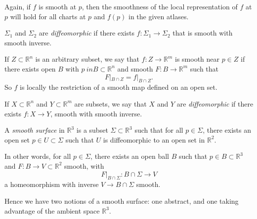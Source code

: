 \documentclass[12pt]{article}
\begin{document}
Again, if $f$ is smooth at $p$, then the smoothness of the local representation of $f$ at $p$ will hold for all charts at $p$ and $f(p)$ in the given atlases.

\begin{definition}
	$\Sigma_1$ and $\Sigma_2$ are \emph{diffeomorphic} if there exists $f : \Sigma_1 \to \Sigma_2$ that is smooth with smooth inverse.
\end{definition}

\begin{definition}
	If $Z \subset \mathbb{R}^{n}$ is an arbitrary subset, we say that $f : Z \to \mathbb{R}^{m}$ is smooth near $p \in Z$ if there exists open $B$ with $p\ in B \subset \mathbb{R}^{n}$ and smooth $F : B \to \mathbb{R}^{m}$ such that
	\[
	F|_{B \cap Z} = f|_{B \cap Z}
	.\]
	So $f$ is locally the restriction of a smooth map defined on an open set.
\end{definition}

\begin{definition}
	If $X \subset \mathbb{R}^{n}$ and $Y \subset \mathbb{R}^{m}$ are subsets, we say that $X$ and $Y$ are \emph{diffeomorphic} if there exists $f : X \to Y$, smooth with smooth inverse.
\end{definition}

\begin{definition}
	A \emph{smooth surface} in $\mathbb{R}^3$ is a subset $\Sigma \subset \mathbb{R}^3$ such that for all $p \in \Sigma$, there exists an open set $p \in U \subset \Sigma$ such that $U$ is diffeomorphic to an open set in $\mathbb{R}^2$.

	In other words, for all $p \in \Sigma$, there exists an open ball $B$ such that $p\in B \subset \mathbb{R}^3$ and $F : B \to V \subset \mathbb{R}^2$ smooth, with
	\[
	F|_{B \cap \Sigma} : B \cap \Sigma \to V
	\]
	a homeomorphism with inverse $V \to B \cap \Sigma$ smooth.
\end{definition}

Hence we have two notions of a smooth surface: one abstract, and one taking advantage of the ambient space $\mathbb{R}^3$.
\end{document}
